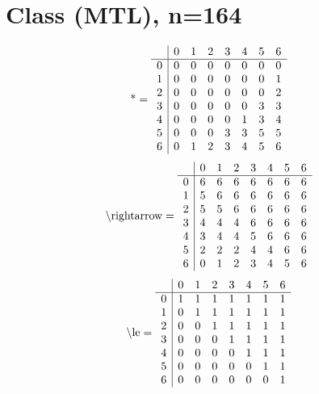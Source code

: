 \documentclass[11pt]{article}
\begin{document}
\section{Class (MTL), n=164}
\[\text{*} = 
\begin{array}{r | r r r r r r r}
 & 0 & 1 & 2 & 3 & 4 & 5 & 6 \\ \hline
0 & 0 & 0 & 0 & 0 & 0 & 0 & 0 \\
1 & 0 & 0 & 0 & 0 & 0 & 0 & 1 \\
2 & 0 & 0 & 0 & 0 & 0 & 0 & 2 \\
3 & 0 & 0 & 0 & 0 & 0 & 3 & 3 \\
4 & 0 & 0 & 0 & 0 & 1 & 3 & 4 \\
5 & 0 & 0 & 0 & 3 & 3 & 5 & 5 \\
6 & 0 & 1 & 2 & 3 & 4 & 5 & 6 \\
\end{array}
\]
\[\text{\textbackslash rightarrow} = 
\begin{array}{r | r r r r r r r}
 & 0 & 1 & 2 & 3 & 4 & 5 & 6 \\ \hline
0 & 6 & 6 & 6 & 6 & 6 & 6 & 6 \\
1 & 5 & 6 & 6 & 6 & 6 & 6 & 6 \\
2 & 5 & 5 & 6 & 6 & 6 & 6 & 6 \\
3 & 4 & 4 & 4 & 6 & 6 & 6 & 6 \\
4 & 3 & 4 & 4 & 5 & 6 & 6 & 6 \\
5 & 2 & 2 & 2 & 4 & 4 & 6 & 6 \\
6 & 0 & 1 & 2 & 3 & 4 & 5 & 6 \\
\end{array}
\]
\[\text{\textbackslash le} = 
\begin{array}{r | r r r r r r r}
 & 0 & 1 & 2 & 3 & 4 & 5 & 6 \\ \hline
0 & 1 & 1 & 1 & 1 & 1 & 1 & 1 \\
1 & 0 & 1 & 1 & 1 & 1 & 1 & 1 \\
2 & 0 & 0 & 1 & 1 & 1 & 1 & 1 \\
3 & 0 & 0 & 0 & 1 & 1 & 1 & 1 \\
4 & 0 & 0 & 0 & 0 & 1 & 1 & 1 \\
5 & 0 & 0 & 0 & 0 & 0 & 1 & 1 \\
6 & 0 & 0 & 0 & 0 & 0 & 0 & 1 \\
\end{array}
\]
\end{document}
